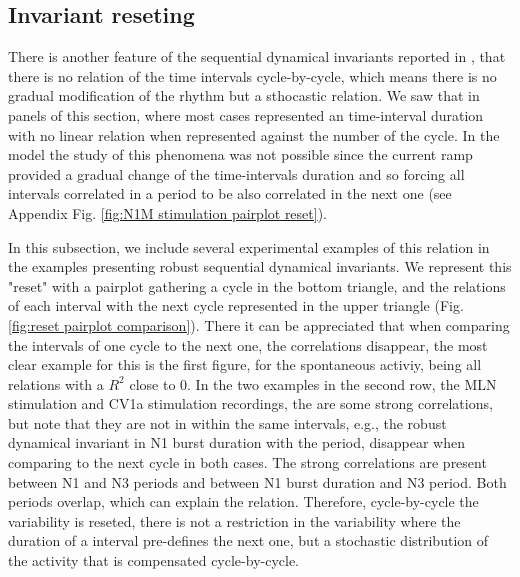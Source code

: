 \subsection{Invariant reseting}
There is another feature of the sequential dynamical invariants reported in \cite{elices_robust_2019}, that there is no relation of the time intervals cycle-by-cycle, which means there is no gradual modification of the rhythm but a sthocastic relation. We saw that in panels of this section, where most cases represented an time-interval duration with no linear relation when represented against the number of the cycle. In the model the study of this phenomena was not possible since the current ramp provided a gradual change of the time-intervals duration and so forcing all intervals correlated in a period to be also correlated in the next one (see Appendix Fig. \ref{fig:N1M stimulation pairplot reset}). 

In this subsection, we include several experimental examples of this relation in the examples presenting robust sequential dynamical invariants. We represent this "reset" with a pairplot gathering a cycle in the bottom triangle, and the relations of each interval with the next cycle represented in the upper triangle (Fig. \ref{fig:reset pairplot comparison}). There it can be appreciated that when comparing the intervals of one cycle to the next one, the correlations disappear, the most clear example for this is the first figure, for the spontaneous activiy, being all relations with a $R^2$ close to 0. In the two examples in the second row, the MLN stimulation and CV1a stimulation recordings, the are some strong correlations, but note that they are not in within the same intervals, e.g., the robust dynamical invariant in N1 burst duration with the period, disappear when comparing to the next cycle in both cases. The strong correlations are present between N1 and N3 periods and between N1 burst duration and N3 period. Both periods overlap, which can explain the relation. Therefore, cycle-by-cycle the variability is reseted, there is not a restriction in the variability where the duration of a interval pre-defines the next one, but a stochastic distribution of the activity that is compensated cycle-by-cycle. 

